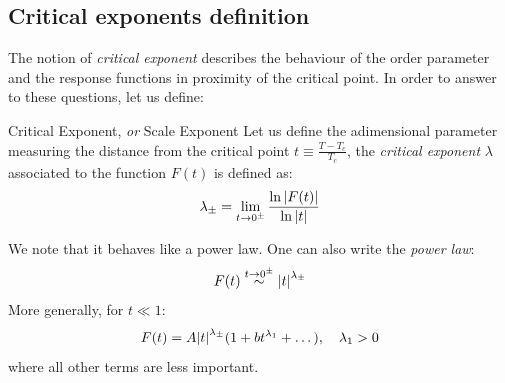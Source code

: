 \documentclass[../main/main.tex]{subfiles}
\begin{document}
\subsection{Critical exponents definition}

The notion of \emph{critical exponent} describes the behaviour of the order parameter and the response functions in proximity of the critical point.
In order to answer to these questions, let us define:


\begin{definition}{Critical Exponent, \emph{or} Scale Exponent}{}
Let us define the adimensional parameter measuring the distance from the critical point \( t \equiv \frac{T-T_c}{T_c} \), the \emph{critical exponent} \( \lambda  \) associated to the function \( F(t) \) is defined as:
\begin{equation}
  \lambda _{\pm} = \lim_{t \rightarrow 0^{\pm}} \frac{\ln{\abs{F(t)} } }{\ln{\abs{t} } }
\end{equation}
\end{definition}

We note that it behaves like a power law. One can also write the \textit{power law}:
\begin{equation}
  F(t) \overset{t \rightarrow  0^{\pm}}{\sim } \abs{t}^{\lambda _{\pm}}
\end{equation}
More generally, for \( t \ll 1 \):
\begin{equation}
  F(t) = A \abs{t}^{\lambda _{\pm}} ( 1 + bt^{\lambda _1}+ \dots), \quad \lambda _1 > 0
\end{equation}
where all other terms are less important.
\end{document}
